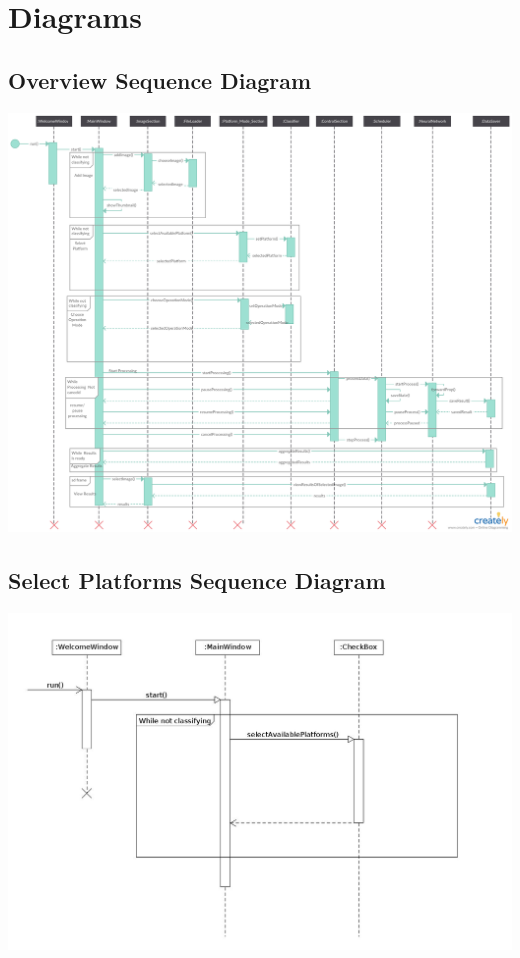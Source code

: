\documentclass[parskip=full]{scrartcl}
\begin{document}
\pagebreak



\section {Diagrams}

\subsection {Overview Sequence Diagram}

\begin{center}
\includegraphics[width=1.0\textwidth]{seq.Diag.png}
\end{center}

\pagebreak

\subsection {Select Platforms Sequence Diagram}

\begin{center}
\includegraphics[width=1.0\textwidth]{SelectPlatforms.jpg}
\end{center}
\end{document}
